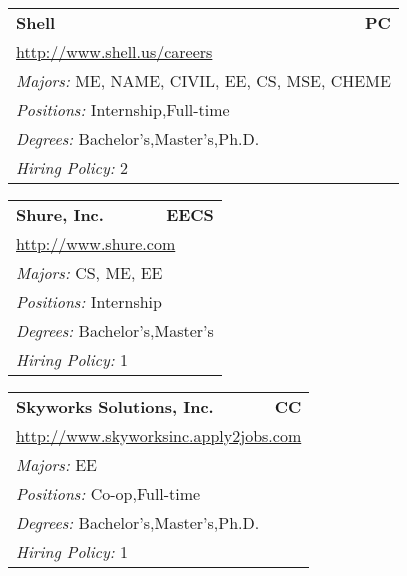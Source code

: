 \documentclass[twoside]{article}
\begin{document}
\begin{center}
\begin{multicols}{3}
\begin{FlushLeft}
\begin{minipage}{.9\columnwidth}
\end{minipage}
 
\begin{minipage}{.9\columnwidth}\begin{tabularx}{.95\columnwidth}{Xr}
                 {\Large\bf Shell} & {\Large\bf PC}\\
    \multicolumn{2}{p{.95\columnwidth}}{\url{http://www.shell.us/careers}}\\
    \multicolumn{2}{p{.95\columnwidth}}{\emph{Majors:} ME, NAME, CIVIL, EE, CS, MSE, CHEME}\\
    \multicolumn{2}{p{.95\columnwidth}}{\emph{Positions:} Internship,Full-time}\\
    \multicolumn{2}{p{.95\columnwidth}}{\emph{Degrees:} Bachelor's,Master's,Ph.D.}\\
    \multicolumn{2}{p{.95\columnwidth}}{\emph{Hiring Policy:} 2}\\
    \end{tabularx}
    
\end{minipage}
 
\begin{minipage}{.9\columnwidth}\begin{tabularx}{.95\columnwidth}{Xr}
                 {\Large\bf Shure, Inc.} & {\Large\bf EECS}\\
    \multicolumn{2}{p{.95\columnwidth}}{\url{http://www.shure.com}}\\
    \multicolumn{2}{p{.95\columnwidth}}{\emph{Majors:} CS, ME, EE}\\
    \multicolumn{2}{p{.95\columnwidth}}{\emph{Positions:} Internship}\\
    \multicolumn{2}{p{.95\columnwidth}}{\emph{Degrees:} Bachelor's,Master's}\\
    \multicolumn{2}{p{.95\columnwidth}}{\emph{Hiring Policy:} 1}\\
    \end{tabularx}
    
\end{minipage}
 
\begin{minipage}{.9\columnwidth}\begin{tabularx}{.95\columnwidth}{Xr}
                 {\Large\bf Skyworks Solutions, Inc.} & {\Large\bf CC}\\
    \multicolumn{2}{p{.95\columnwidth}}{\url{http://www.skyworksinc.apply2jobs.com}}\\
    \multicolumn{2}{p{.95\columnwidth}}{\emph{Majors:} EE}\\
    \multicolumn{2}{p{.95\columnwidth}}{\emph{Positions:} Co-op,Full-time}\\
    \multicolumn{2}{p{.95\columnwidth}}{\emph{Degrees:} Bachelor's,Master's,Ph.D.}\\
    \multicolumn{2}{p{.95\columnwidth}}{\emph{Hiring Policy:} 1}\\
    \end{tabularx}
    

\end{minipage}
\end{FlushLeft}
\end{multicols}
\end{center}
\end{document}
